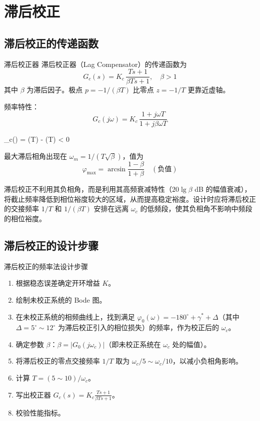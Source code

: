 \section{滞后校正}

\subsection{滞后校正的传递函数}

\begin{mydefinition}{滞后校正器}
滞后校正器（Lag Compensator）的传递函数为
\[
G_c(s) = K_c\,\frac{Ts + 1}{\beta Ts + 1},\quad \beta > 1
\]
其中 $\beta$ 为滞后因子。极点 $p = -1/(\beta T)$ 比零点 $z = -1/T$ 更靠近虚轴。
\end{mydefinition}

频率特性：
\[
G_c(j\omega) = K_c\,\frac{1 + j\omega T}{1 + j\beta\omega T}
\]

\begin{myformula}
\varphi_c(\omega) = \arctan(\omega T) - \arctan(\beta\omega T) < 0
\end{myformula}

最大滞后相角出现在 $\omega_m = 1/(T\sqrt{\beta})$，值为
\[
\varphi_{\max} = \arcsin\frac{1 - \beta}{1 + \beta} \quad (\text{负值})
\]

\begin{remark}
滞后校正不利用其负相角，而是利用其高频衰减特性（$20\lg\beta$ dB 的幅值衰减），将截止频率降低到相位裕度较大的区域，从而提高稳定裕度。设计时应将滞后校正的交接频率 $1/T$ 和 $1/(\beta T)$ 安排在远离 $\omega_c$ 的低频段，使其负相角不影响中频段的相位裕度。
\end{remark}

\subsection{滞后校正的设计步骤}

\begin{myalgorithm}{滞后校正的频率法设计步骤}
\begin{enumerate}
    \item 根据稳态误差确定开环增益 $K$。
    \item 绘制未校正系统的 Bode 图。
    \item 在未校正系统的相频曲线上，找到满足 $\varphi_0(\omega) = -180^{\circ} + \gamma^* + \Delta$（其中 $\Delta = 5^{\circ}\sim 12^{\circ}$ 为滞后校正引入的相位损失）的频率，作为校正后的 $\omega_c$。
    \item 确定参数 $\beta$：$\beta = |G_0(j\omega_c)|$（即未校正系统在 $\omega_c$ 处的幅值）。
    \item 将滞后校正的零点交接频率 $1/T$ 取为 $\omega_c/5 \sim \omega_c/10$，以减小负相角影响。
    \item 计算 $T = (5\sim 10)/\omega_c$。
    \item 写出校正器 $G_c(s) = K_c\frac{Ts + 1}{\beta Ts + 1}$。
    \item 校验性能指标。
\end{enumerate}
\end{myalgorithm}

